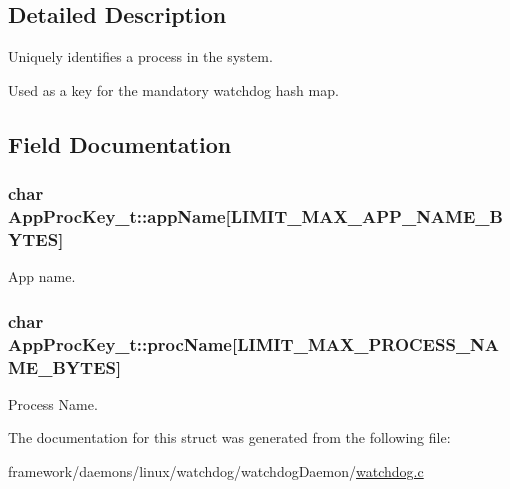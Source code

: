 \subsection{Detailed Description}
Uniquely identifies a process in the system.

Used as a key for the mandatory watchdog hash map. 

\subsection{Field Documentation}
\subsubsection[{\texorpdfstring{app\+Name}{appName}}]{\setlength{\rightskip}{0pt plus 5cm}char App\+Proc\+Key\+\_\+t\+::app\+Name\mbox{[}{\bf L\+I\+M\+I\+T\+\_\+\+M\+A\+X\+\_\+\+A\+P\+P\+\_\+\+N\+A\+M\+E\+\_\+\+B\+Y\+T\+ES}\mbox{]}}\hypertarget{struct_app_proc_key__t_ada5fa9789269af3f0f4bbf52f70167c8}{}\label{struct_app_proc_key__t_ada5fa9789269af3f0f4bbf52f70167c8}


App name. 

\subsubsection[{\texorpdfstring{proc\+Name}{procName}}]{\setlength{\rightskip}{0pt plus 5cm}char App\+Proc\+Key\+\_\+t\+::proc\+Name\mbox{[}{\bf L\+I\+M\+I\+T\+\_\+\+M\+A\+X\+\_\+\+P\+R\+O\+C\+E\+S\+S\+\_\+\+N\+A\+M\+E\+\_\+\+B\+Y\+T\+ES}\mbox{]}}\hypertarget{struct_app_proc_key__t_a26c5e602834da2e2c4186afc97a05ba3}{}\label{struct_app_proc_key__t_a26c5e602834da2e2c4186afc97a05ba3}


Process Name. 



The documentation for this struct was generated from the following file\+:\begin{DoxyCompactItemize}
\item 
framework/daemons/linux/watchdog/watchdog\+Daemon/\hyperlink{watchdog_8c}{watchdog.\+c}\end{DoxyCompactItemize}
